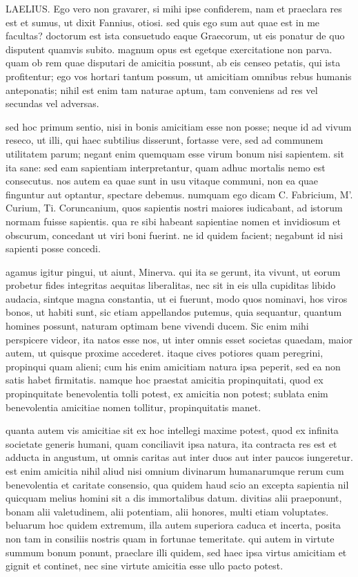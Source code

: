  LAELIUS. Ego vero non gravarer, si mihi ipse confiderem, nam et praeclara res est et sumus, ut dixit Fannius, otiosi. sed quis ego sum aut quae est in me facultas? doctorum est ista consuetudo eaque Graecorum, ut eis ponatur de quo disputent quamvis subito. magnum opus est egetque exercitatione non parva. quam ob rem quae disputari de amicitia possunt, ab eis censeo petatis, qui ista profitentur; ego vos hortari tantum possum, ut amicitiam omnibus rebus humanis anteponatis; nihil est enim tam naturae aptum, tam conveniens ad res vel secundas vel adversas.

 sed hoc primum sentio, nisi in bonis amicitiam esse non posse; neque id ad vivum reseco, ut illi, qui haec subtilius disserunt, fortasse vere, sed ad communem utilitatem parum; negant enim quemquam esse virum bonum nisi sapientem. sit ita sane: sed eam sapientiam interpretantur, quam adhuc mortalis nemo est consecutus. nos autem ea quae sunt in usu vitaque communi, non ea quae finguntur aut optantur, spectare debemus. numquam ego dicam C. Fabricium, M'. Curium, Ti. Coruncanium, quos sapientis nostri maiores iudicabant, ad istorum normam fuisse sapientis. qua re sibi habeant sapientiae nomen et invidiosum et obscurum, concedant ut viri boni fuerint. ne id quidem facient; negabunt id nisi sapienti posse concedi.

 agamus igitur pingui, ut aiunt, Minerva. qui ita se gerunt, ita vivunt, ut eorum probetur fides integritas aequitas liberalitas, nec sit in eis ulla cupiditas libido audacia, sintque magna constantia, ut ei fuerunt, modo quos nominavi, hos viros bonos, ut habiti sunt, sic etiam appellandos putemus, quia sequantur, quantum homines possunt, naturam optimam bene vivendi ducem. Sic enim mihi perspicere videor, ita natos esse nos, ut inter omnis esset societas quaedam, maior autem, ut quisque proxime accederet. itaque cives potiores quam peregrini, propinqui quam alieni; cum his enim amicitiam natura ipsa peperit, sed ea non satis habet firmitatis. namque hoc praestat amicitia propinquitati, quod ex propinquitate benevolentia tolli potest, ex amicitia non potest; sublata enim benevolentia amicitiae nomen tollitur, propinquitatis manet.

 quanta autem vis amicitiae sit ex hoc intellegi maxime potest, quod ex infinita societate generis humani, quam conciliavit ipsa natura, ita contracta res est et adducta in angustum, ut omnis caritas aut inter duos aut inter paucos iungeretur. est enim amicitia nihil aliud nisi omnium divinarum humanarumque rerum cum benevolentia et caritate consensio, qua quidem haud scio an excepta sapientia nil quicquam melius homini sit a dis immortalibus datum. divitias alii praeponunt, bonam alii valetudinem, alii potentiam, alii honores, multi etiam voluptates. beluarum hoc quidem extremum, illa autem superiora caduca et incerta, posita non tam in consiliis nostris quam in fortunae temeritate. qui autem in virtute summum bonum ponunt, praeclare illi quidem, sed haec ipsa virtus amicitiam et gignit et continet, nec sine virtute amicitia esse ullo pacto potest.

